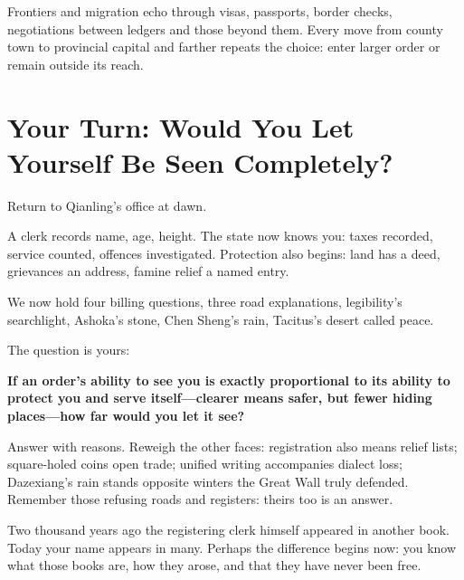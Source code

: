 Frontiers and migration echo through visas, passports, border checks, negotiations between ledgers and those beyond them. Every move from county town to provincial capital and farther repeats the choice: enter larger order or remain outside its reach.

\section[Your Turn: How Visible Will You Be?]{Your Turn: Would You Let Yourself Be Seen Completely?}
Return to Qianling's office at dawn.

A clerk records name, age, height. The state now knows you: taxes recorded, service counted, offences investigated. Protection also begins: land has a deed, grievances an address, famine relief a named entry.

We now hold four billing questions, three road explanations, legibility's searchlight, Ashoka's stone, Chen Sheng's rain, Tacitus's desert called peace.

The question is yours:

\textbf{If an order's ability to see you is exactly proportional to its ability to protect you and serve itself---clearer means safer, but fewer hiding places---how far would you let it see?}

Answer with reasons. Reweigh the other faces: registration also means relief lists; square-holed coins open trade; unified writing accompanies dialect loss; Dazexiang's rain stands opposite winters the Great Wall truly defended. Remember those refusing roads and registers: theirs too is an answer.

Two thousand years ago the registering clerk himself appeared in another book. Today your name appears in many. Perhaps the difference begins now: you know what those books are, how they arose, and that they have never been free.

